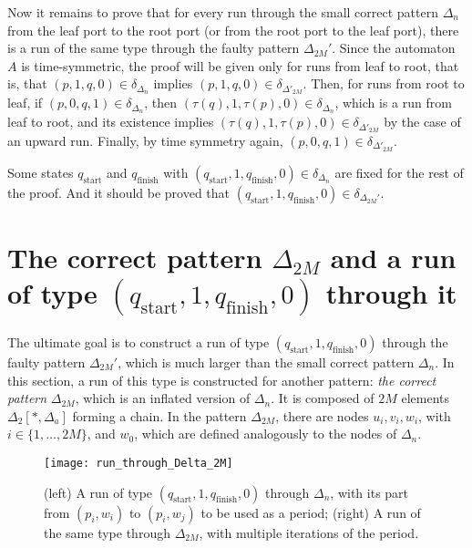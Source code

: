 \documentclass[12pt,a4paper]{article}
\theoremstyle{definition}
\begin{document}
Now it remains to prove that for every run through the small correct pattern $\Delta_n$
from the leaf port to the root port (or from the root port to the leaf port),
there is a run of the same type
through the faulty pattern $\Delta_{2M}'$.
Since the automaton $A$ is time-symmetric,
the proof will be given only for runs from leaf to root,
that is, that $(p,1,q,0) \in \delta_{\Delta_n}$ implies $(p,1,q,0) \in \delta_{\Delta'_{2M}}$.
Then, for runs from root to leaf, if $(p,0,q,1) \in \delta_{\Delta_n}$,
then $(\tau(q),1,\tau(p),0) \in \delta_{\Delta_n}$,
which is a run from leaf to root, and its existence implies
$(\tau(q),1,\tau(p),0) \in \delta_{\Delta'_{2M}}$
by the case of an upward run.
Finally, by time symmetry again, $(p,0,q,1) \in \delta_{\Delta'_{2M}}$.

Some states $q_{\text{start}}$ and $q_{\text{finish}}$
with $(q_{\text{start}},1,q_{\text{finish}},0) \in \delta_{\Delta_n}$
are fixed for the rest of the proof.
And it should be proved that $(q_{\text{start}},1,q_{\text{finish}},0) \in \delta_{\Delta_{2M}'}$.






\section{The correct pattern $\Delta_{2M}$ and a run of type $(q_{\text{start}},1,q_{\text{finish}},0)$ through it}\label{section_passing_through_Delta_2M}

The ultimate goal is to construct a run of type $(q_{\text{start}},1,q_{\text{finish}},0)$
through the faulty pattern $\Delta_{2M}'$,
which is much larger than the small correct pattern $\Delta_n$.
In this section, a run of this type is constructed for another pattern:
\emph{the correct pattern} $\Delta_{2M}$, which is an inflated version of $\Delta_n$.
It is composed of $2M$ elements $\Delta_2[*,\Delta_a]$ forming a chain.
In the pattern $\Delta_{2M}$, there are nodes $u_i,v_i,w_i$, with $i \in \{1,\ldots,2M\}$,
and $w_0$, which are defined analogously to the nodes of $\Delta_n$.

\begin{figure}[hbtp]
	\centerline{\texttt{[image: run\_through\_Delta\_2M]}}
	\caption{(left) A run of type $(q_{\text{start}},1,q_{\text{finish}},0)$
		through $\Delta_n$, with its part from $(p_i, w_i)$ to $(p_i, w_j)$ to be used as a period;
		(right) A run of the same type through $\Delta_{2M}$, with multiple iterations of the period.}
	\label{f:run_through_Delta_2M}
\end{figure}
\end{document}

